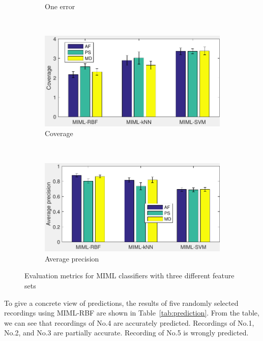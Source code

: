 \begin{figure}[htb!]
\begin{subfigure}[b]{0.45\textwidth}
                \caption{One error}               
        \end{subfigure}  
~
              \begin{subfigure}[b]{0.45\textwidth}
                \includegraphics[width=\textwidth]{image/Ch6/coverage.pdf} 
                \caption{Coverage}                
        \end{subfigure}          
   \\
              \begin{subfigure}[b]{0.45\textwidth}
                \includegraphics[width=\textwidth]{image/Ch6/avgPrecision.pdf}  
                     \caption{Average precision}         
        \end{subfigure}      
\caption[MIML classification results]{Evaluation metrics for MIML classifiers with three different feature sets}
        \label{fig:classificationResults}
\end{figure}

To give a concrete view of predictions, the results of five randomly selected recordings using MIML-RBF are shown in Table~\ref{tab:prediction}. From the table, we can see that recordings of No.4 are accurately predicted. Recordings of No.1, No.2, and No.3 are partially accurate. Recording of No.5 is wrongly predicted.

